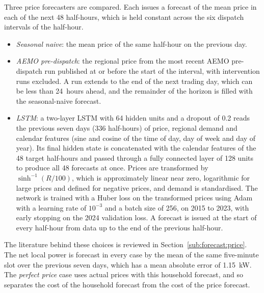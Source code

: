 Three price forecasters are compared. Each issues a forecast of the mean price in each
of the next 48 half-hours, which is held constant across the six dispatch intervals of
the half-hour.
\begin{itemize}
    \item \emph{Seasonal naive}: the mean price of the same half-hour on the previous
    day.
    \item \emph{AEMO pre-dispatch}: the regional price from the most recent AEMO
    pre-dispatch run published at or before the start of the interval, with
    intervention runs excluded. A run extends to the end of the next trading day, which
    can be less than 24~hours ahead, and the remainder of the horizon is filled with the
    seasonal-naive forecast.
    \item \emph{LSTM}: a two-layer LSTM with 64 hidden units and a dropout of 0.2 reads
    the previous seven days (336 half-hours) of price, regional demand and calendar
    features (sine and cosine of the time of day, day of week and day of year). Its
    final hidden state is concatenated with the calendar features of the 48 target
    half-hours and passed through a fully connected layer of 128 units to produce all
    48 forecasts at once. Prices are transformed by $\sinh^{-1}(R/100)$, which is
    approximately linear near zero, logarithmic for large prices and defined for
    negative prices, and demand is standardised. The network is trained with a Huber
    loss on the transformed prices using Adam with a learning rate of $10^{-3}$ and a
    batch size of 256, on 2015 to 2023, with early stopping on the 2024 validation
    loss. A forecast is issued at the start of every half-hour from data up to the end
    of the previous half-hour.
\end{itemize}
The literature behind these choices is reviewed in Section~\ref{sub:forecast:price}.
The net local power is forecast in every case by the mean of the same five-minute slot
over the previous seven days, which has a mean absolute error of 1.15~kW. The
\emph{perfect price} case uses actual prices with this household forecast, and so
separates the cost of the household forecast from the cost of the price forecast.

